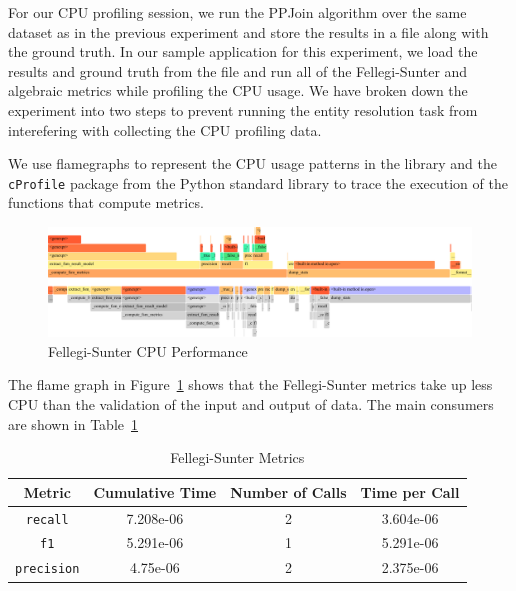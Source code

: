 \documentclass[a4paper,twoside]{article}
\begin{document}
    For our CPU profiling session, we run the PPJoin algorithm over the same
    dataset as in the previous experiment and store the results in a file
    along with the ground truth.
    In our sample application for this experiment, we load the results and 
    ground truth from the file and run all of the Fellegi-Sunter and algebraic
    metrics while profiling the CPU usage.
    We have broken down the experiment into two steps to prevent running the
    entity resolution task from interefering with collecting the CPU profiling
    data.

    We use flamegraphs\cite{flamegraphs2013} to represent the CPU usage
    patterns in the library and the \texttt{cProfile} package from the Python
    standard library to trace the execution of the functions that compute
    metrics.

    \begin{figure}[h!]
        \centering
        \includegraphics[width=\textwidth]{performance/fs-flamegraph}
        \caption{Fellegi-Sunter CPU Performance}\label{fig:fs-cpu-perf}
    \end{figure}

    The flame graph in Figure~\ref{fig:fs-cpu-perf}
    shows that the Fellegi-Sunter metrics take up less CPU than the validation
    of the input and output of data.
    The main consumers are shown in Table~\ref{table:fs-cpu-perf}
    
    \begin{table}[ht!]
        \centering
        \begin{tabular}{||c c c c||}
            \hline
            Metric & Cumulative Time & Number of Calls & Time per Call \\ [0.5ex]
            \hline\hline
            \texttt{recall} & 7.208e-06 & 2 & 3.604e-06 \\
            \hline
            \texttt{f1} & 5.291e-06 & 1 & 5.291e-06 \\
            \hline
            \texttt{precision} & 4.75e-06 & 2 & 2.375e-06 \\
            \hline
        \end{tabular}
        \caption{Fellegi-Sunter Metrics}
        \label{table:fs-cpu-perf}
    \end{table}
\end{document}

